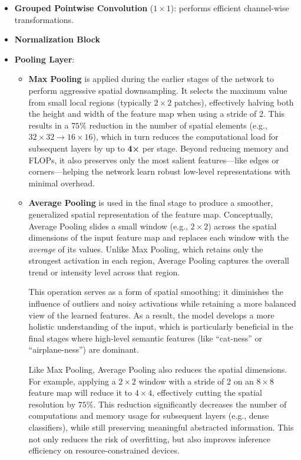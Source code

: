 \begin{itemize}
  \item \textbf{Grouped Pointwise Convolution} (\(1 \times 1\)): performs efficient channel-wise transformations.
  \item \textbf{Normalization Block}
  
  \item \textbf{Pooling Layer}:
  \begin{itemize}

    \item \textbf{Max Pooling} is applied during the earlier stages of the network to perform aggressive spatial downsampling. It selects the maximum value from small local regions (typically $2 \times 2$ patches), effectively halving both the height and width of the feature map when using a stride of 2. This results in a $75\%$ reduction in the number of spatial elements (e.g., $32 \times 32 \rightarrow 16 \times 16$), which in turn reduces the computational load for subsequent layers by up to \textbf{4×} per stage. Beyond reducing memory and FLOPs, it also preserves only the most salient features—like edges or corners—helping the network learn robust low-level representations with minimal overhead.

    \item \textbf{Average Pooling} is used in the final stage to produce a smoother, generalized spatial representation of the feature map. Conceptually, Average Pooling slides a small window (e.g., $2 \times 2$) across the spatial dimensions of the input feature map and replaces each window with the \emph{average} of its values. Unlike Max Pooling, which retains only the strongest activation in each region, Average Pooling captures the overall trend or intensity level across that region.

    This operation serves as a form of spatial smoothing: it diminishes the influence of outliers and noisy activations while retaining a more balanced view of the learned features. As a result, the model develops a more holistic understanding of the input, which is particularly beneficial in the final stages where high-level semantic features (like “cat-ness” or “airplane-ness”) are dominant.
    
    Like Max Pooling, Average Pooling also reduces the spatial dimensions. For example, applying a $2 \times 2$ window with a stride of 2 on an $8 \times 8$ feature map will reduce it to $4 \times 4$, effectively cutting the spatial resolution by $75\%$. This reduction significantly decreases the number of computations and memory usage for subsequent layers (e.g., dense classifiers), while still preserving meaningful abstracted information. This not only reduces the risk of overfitting, but also improves inference efficiency on resource-constrained devices.
  \end{itemize}
  

\end{itemize}
